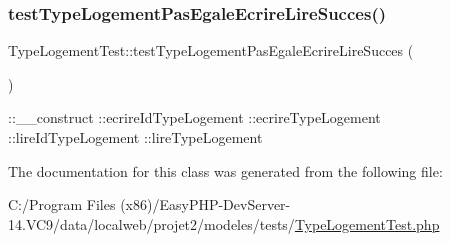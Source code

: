 \subsubsection{\texorpdfstring{test\+Type\+Logement\+Pas\+Egale\+Ecrire\+Lire\+Succes()}{testTypeLogementPasEgaleEcrireLireSucces()}}
{\footnotesize\ttfamily Type\+Logement\+Test\+::test\+Type\+Logement\+Pas\+Egale\+Ecrire\+Lire\+Succes (\begin{DoxyParamCaption}{ }\end{DoxyParamCaption})}

\+::\+\_\+\+\_\+construct  \+::ecrire\+Id\+Type\+Logement  \+::ecrire\+Type\+Logement  \+::lire\+Id\+Type\+Logement  \+::lire\+Type\+Logement 

The documentation for this class was generated from the following file\+:\begin{DoxyCompactItemize}
\item 
C\+:/\+Program Files (x86)/\+Easy\+P\+H\+P-\/\+Dev\+Server-\/14.\+V\+C9/data/localweb/projet2/modeles/tests/\hyperlink{_type_logement_test_8php}{Type\+Logement\+Test.\+php}\end{DoxyCompactItemize}
